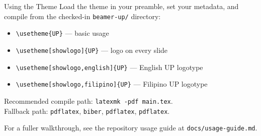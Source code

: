 \documentclass[aspectratio=169]{beamer}
\begin{document}
\begin{frame}{Using the Theme}
  Load the theme in your preamble, set your metadata, and compile from the checked-in
  \texttt{beamer-up/} directory:

  \begin{itemize}
    \item \texttt{\textbackslash usetheme\{UP\}} --- basic usage
    \item \texttt{\textbackslash usetheme[showlogo]\{UP\}} --- logo on every slide
    \item \texttt{\textbackslash usetheme[showlogo,english]\{UP\}} --- English UP logotype
    \item \texttt{\textbackslash usetheme[showlogo,filipino]\{UP\}} --- Filipino UP logotype
  \end{itemize}

  \vskip 6pt
  Recommended compile path: \texttt{latexmk -pdf main.tex}.\\
  Fallback path: \texttt{pdflatex}, \texttt{biber}, \texttt{pdflatex}, \texttt{pdflatex}.

  \vskip 6pt
  For a fuller walkthrough, see the repository usage guide at
  \texttt{docs/usage-guide.md}.
\end{frame}
\end{document}
